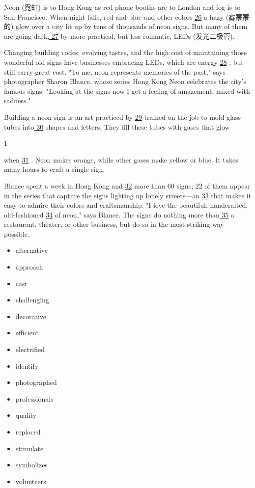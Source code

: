 \documentclass[UTF8,11pt]{ctexart}
\begin{document}
Neon (霓虹) is to Hong Kong as red phone booths are to London and fog is to San Francisco. When night falls, red and blue and other colors \uline{26} a hazy (雾蒙蒙的) glow over a city lit up by tens of thousands of neon signs. But many of them are going dark,\uline{ 27} by more practical, but less romantic, LEDs (发光二极管).


Changing building codes, evolving tastes, and the high cost of maintaining those wonderful old signs have businesses embracing LEDs, which are energy \uline{28} , but still carry great cost. "To me, neon represents memories of the past," says photographer Sharon Blance, whose series Hong Kong Neon celebrates the city's famous signs. "Looking at the signs now I get a feeling of amazement, mixed with sadness."


Building a neon sign is an art practiced by \uline{29} trained on the job to mold glass tubes into\uline{ 30} shapes and letters. They fill these tubes with gases that glow


1


when \uline{31} . Neon makes orange, while other gases make yellow or blue. It takes many hours to craft a single sign.


Blance spent a week in Hong Kong and \uline{32} more than 60 signs; 22 of them appear in the series that capture the signs lighting up lonely streets—an \uline{33} that makes it easy to admire their colors and craftsmanship. "I love the beautiful, handcrafted, old-fashioned \uline{34} of neon," says Blance. The signs do nothing more than\uline{ 35} a restaurant, theater, or other business, but do so in the most striking way possible.


\begin{itemize}[leftmargin=2em,itemsep=.2em,topsep=.4em]\item[A.] alternative
\item[B.] approach
\item[C.] cast
\item[D.] challenging
\item[E.] decorative
\item[F.] efficient
\item[G.] electrified
\item[H.] identify
\item[I.] photographed
\item[J.] professionals
\item[K.] quality
\item[L.] replaced
\item[M.] stimulate
\item[N.] symbolizes
\item[O.] volunteers
\end{itemize}
\end{document}
